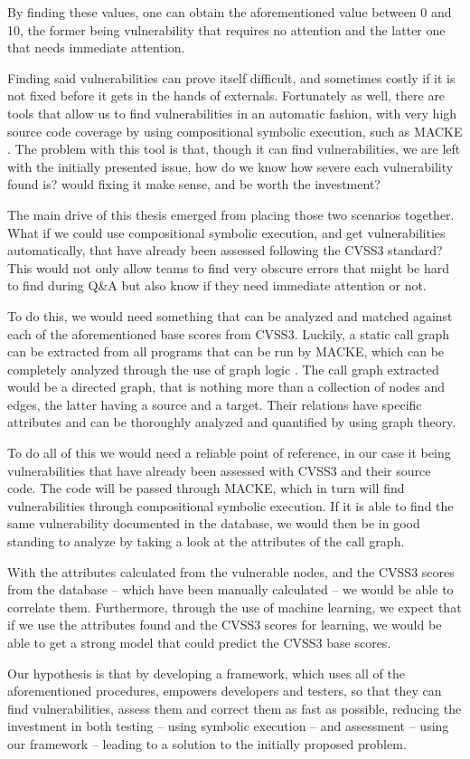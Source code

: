 By finding these values, one can obtain the aforementioned value between 0 and 10, the former being vulnerability that requires no attention and the latter one that needs immediate attention.

Finding said vulnerabilities can prove itself difficult, and sometimes costly if it is not fixed before it gets in the hands of externals. Fortunately as well, there are tools that allow us to find vulnerabilities in an automatic fashion, with very high source code coverage by using compositional symbolic execution, such as MACKE \parencite{ognawala}. The problem with this tool is that, though it can find vulnerabilities, we are left with the initially presented issue, how do we know how severe each vulnerability found is? would fixing it make sense, and be worth the investment?

The main drive of this thesis emerged from placing those two scenarios together. What if we could use compositional symbolic execution, and get vulnerabilities automatically, that have already been assessed following the CVSS3 standard? This would not only allow teams to find very obscure errors that might be hard to find during Q\&A but also know if they need immediate attention or not.

To do this, we would need something that can be analyzed and matched against each of the aforementioned base scores from CVSS3. Luckily, a static call graph can be extracted from all programs that can be run by MACKE, which can be completely analyzed through the use of graph logic \parencite{graphs}. The call graph extracted would be a directed graph, that is nothing more than a collection of nodes and edges, the latter having a source and a target. Their relations have specific attributes and can be thoroughly analyzed and quantified by using graph theory.

To do all of this we would need a reliable point of reference, in our case it being vulnerabilities that have already been assessed with CVSS3 and their source code. The code will be passed through MACKE, which in turn will find vulnerabilities through compositional symbolic execution. If it is able to find the same vulnerability documented in the database, we would then be in good standing to analyze by taking a look at the attributes of the call graph. 

With the attributes calculated from the vulnerable nodes, and the CVSS3 scores from the database -- which have been manually calculated -- we would be able to correlate them. Furthermore, through the use of machine learning, we expect that if we use the attributes found and the CVSS3 scores for learning, we would be able to get a strong model that could predict the CVSS3 base scores.

Our hypothesis is that by developing a framework, which uses all of the aforementioned procedures, empowers developers and testers, so that they can find vulnerabilities, assess them and correct them as fast as possible, reducing the investment in both testing -- using symbolic execution -- and assessment -- using our framework -- leading to a solution to the initially proposed problem.